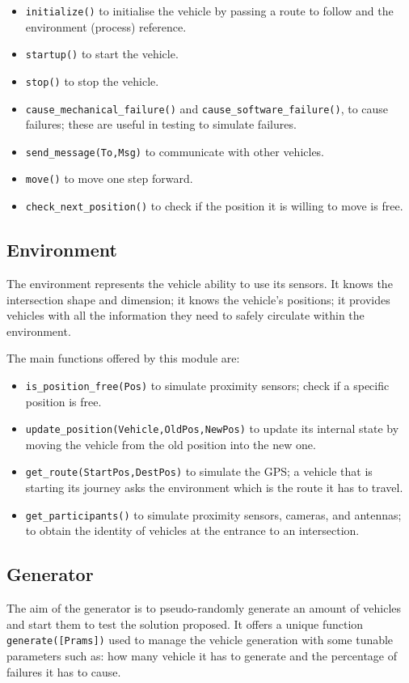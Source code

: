 \documentclass{memoir}
\begin{document}
\begin{itemize}
	\item \texttt{initialize()} to initialise the vehicle by passing a route to follow and the environment (process) reference.
	\item \texttt{startup()} to start the vehicle.
	\item \texttt{stop()} to stop the vehicle.
	\item \texttt{cause\_mechanical\_failure()} and \texttt{cause\_software\_failure()}, to cause failures; these are useful in testing to simulate failures.
	\item \texttt{send\_message(To,Msg)} to communicate with other vehicles.
	\item \texttt{move()} to move one step forward.
	\item \texttt{check\_next\_position()} to check if the position it is willing to move is free.
\end{itemize}


\subsection{Environment}
The environment represents the vehicle ability to use its sensors. It knows the intersection shape and dimension; it knows the vehicle's positions; it provides vehicles with all the information they need to safely circulate within the environment.

The main functions offered by this module are:

\begin{itemize}
	\item \texttt{is\_position\_free(Pos)} to simulate proximity sensors; check if a specific position is free.
	\item \texttt{update\_position(Vehicle,OldPos,NewPos)} to update its internal state by moving the vehicle from the old position into the new one.
	\item \texttt{get\_route(StartPos,DestPos)} to simulate the GPS; a vehicle that is starting its journey asks the environment which is the route it has to travel.
	\item \texttt{get\_participants()} to simulate proximity sensors, cameras, and antennas; to obtain the identity of vehicles at the entrance to an intersection. 
\end{itemize}

\subsection{Generator}
The aim of the generator is to pseudo-randomly generate an amount of vehicles and start them to test the solution proposed. It offers a unique function \verb|generate([Prams])| used to manage the vehicle generation with some tunable parameters such as: how many vehicle it has to generate and the percentage of failures it has to cause.
\end{document}
